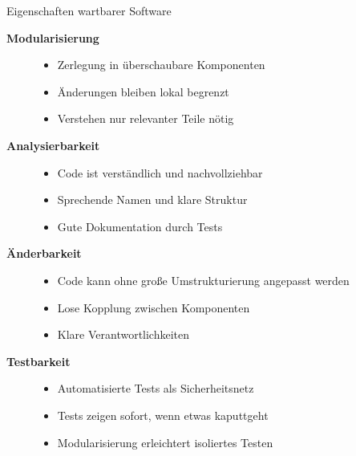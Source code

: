 \begin{frame}{Eigenschaften wartbarer Software}
  \begin{description}
    \item[\textbf{Modularisierung}]
      \begin{itemize}
        \item Zerlegung in überschaubare Komponenten
        \item Änderungen bleiben lokal begrenzt
        \item Verstehen nur relevanter Teile nötig
      \end{itemize}

    \item[\textbf{Analysierbarkeit}]
      \begin{itemize}
        \item Code ist verständlich und nachvollziehbar
        \item Sprechende Namen und klare Struktur
        \item Gute Dokumentation durch Tests
      \end{itemize}

    \item[\textbf{Änderbarkeit}]
      \begin{itemize}
        \item Code kann ohne große Umstrukturierung angepasst werden
        \item Lose Kopplung zwischen Komponenten
        \item Klare Verantwortlichkeiten
      \end{itemize}

    \item[\textbf{Testbarkeit}]
      \begin{itemize}
        \item Automatisierte Tests als Sicherheitsnetz
        \item Tests zeigen sofort, wenn etwas kaputtgeht
        \item Modularisierung erleichtert isoliertes Testen
      \end{itemize}
  \end{description}
\end{frame}

